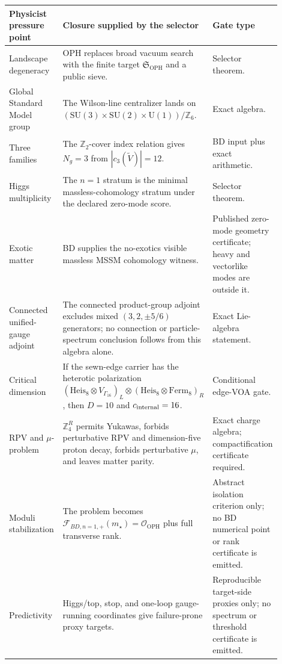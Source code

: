 \documentclass[11pt]{article}
\theoremstyle{remark}
\theoremstyle{plain}
\newcommand{\OPH}{\mathrm{OPH}}
\newcommand{\SU}{\mathrm{SU}}
\newcommand{\U}{\mathrm{U}}
\newcommand{\Z}{\mathbb Z}
\newcommand{\calF}{\mathcal F}
\newcommand{\calO}{\mathcal O}
\newcommand{\ZfourR}{\mathbb Z_4^R}
\begin{document}
\begin{longtable}{p{0.25\linewidth}p{0.43\linewidth}p{0.22\linewidth}}
\toprule
\textbf{Physicist pressure point} & \textbf{Closure supplied by the selector} & \textbf{Gate type} \\
\midrule
Landscape degeneracy & OPH replaces broad vacuum search with the finite target
\(\mathfrak S_{\OPH}\) and a public sieve. & Selector theorem. \\
Global Standard Model group & The Wilson-line centralizer lands on
\((\SU(3)\times\SU(2)\times\U(1))/\Z_6\). & Exact algebra. \\
Three families & The \(\Z_2\)-cover index relation gives \(N_g=3\) from
\(|c_3(\widetilde V)|=12\). & BD input plus exact arithmetic. \\
Higgs multiplicity & The \(n=1\) stratum is the minimal massless-cohomology stratum under the
declared zero-mode score. & Selector theorem. \\
Exotic matter & BD supplies the no-exotics visible massless MSSM cohomology witness. &
Published zero-mode geometry certificate; heavy and vectorlike modes are outside it. \\
Connected unified-gauge adjoint & The connected product-group adjoint excludes mixed
\((3,2,\pm5/6)\) generators; no connection or particle-spectrum conclusion follows from this
algebra alone. & Exact Lie-algebra statement. \\
Critical dimension & If the sewn-edge carrier has the heterotic polarization
\((\mathrm{Heis}_8\otimes V_{\Gamma_{16}})_L\otimes
(\mathrm{Heis}_8\otimes\mathrm{Ferm}_8)_R\), then \(D=10\) and
\(c_{\rm internal}=16\). & Conditional edge-VOA gate. \\
RPV and \(\mu\)-problem & \(\ZfourR\) permits Yukawas, forbids perturbative RPV and
dimension-five proton decay, forbids perturbative \(\mu\), and leaves matter parity. & Exact
charge algebra; compactification certificate required. \\
Moduli stabilization & The problem becomes \(\calF_{BD,n=1,+}(m_\star)=\calO_{\OPH}\) plus
full transverse rank. & Abstract isolation criterion only; no BD numerical point or rank
certificate is emitted. \\
Predictivity & Higgs/top, stop, and one-loop gauge-running coordinates give failure-prone proxy
targets. & Reproducible target-side proxies only; no spectrum or threshold certificate is emitted. \\
\bottomrule
\end{longtable}
\end{document}
